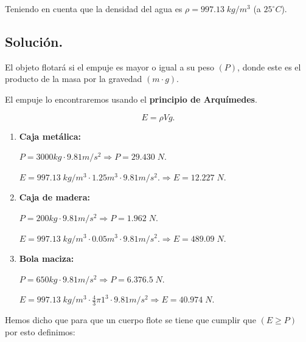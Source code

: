\documentclass[a4paper,12pt]{article} %
\begin{document}
\begin{justify}
    Teniendo en cuenta que la densidad del agua es \(\rho = 997.13 \; kg/m^3\) (a \(25^\circ C\)).
\end{justify}


\newpage 

\subsection{Solución.}


\begin{justify}
    El objeto flotará si el empuje es mayor o igual a su peso \((P)\), donde este es el producto de la masa por la gravedad \((m \cdot g)\).
\end{justify}

\begin{justify}
    El empuje lo encontraremos usando el \textbf{principio de Arquímedes}.
\end{justify}

\[E = \rho V g.\]

\begin{enumerate}
    \item \textbf{Caja metálica:}
    
        \(P = 3000kg \cdot 9.81m/s^2 \Rightarrow \boxed{P = 29.430 \; N.}\)
    
        \(E =  997.13 \; kg/m^3\cdot 1.25m^3 \cdot 9.81 m/s^2. \Rightarrow \boxed{E =12.227 \; N.}\)

    \item \textbf{Caja de madera: }
    
        \(P = 200kg \cdot 9.81m/s^2 \Rightarrow \boxed{P = 1.962 \;N.}\)

        \(E = 997.13 \; kg/m^3\cdot 0.05 m^3 \cdot 9.81 m/s^2. \Rightarrow \boxed{E = 489.09 \; N. }\)

    \item \textbf{Bola maciza:}
    
        \(P = 650kg \cdot 9.81 m/s^2 \Rightarrow \boxed{P = 6.376.5 \; N.}\)

        \(E = 997.13 \; kg/m^3\cdot \frac{4}{3} \pi 1^3 \cdot 9.81 m/s^2 \Rightarrow \boxed{E = 40.974 \; N. } \)
\end{enumerate}

\vspace{\baselineskip}

\begin{justify}
    Hemos dicho que para que un cuerpo flote se tiene que cumplir que \((E \geq P)\) por esto definimos:
\end{justify}
\end{document}
